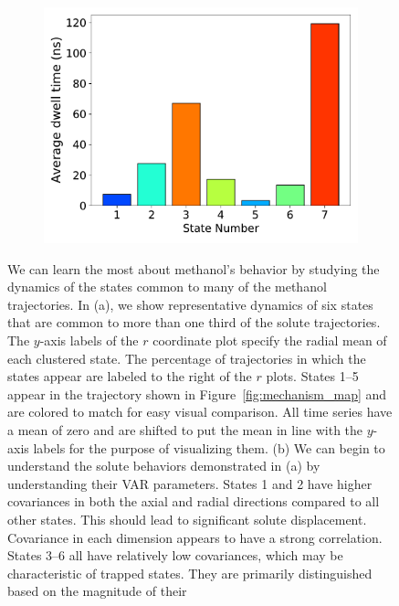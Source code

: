 \documentclass[journal=jpcbfk,manuscript=article]{achemso}
\begin{document}
\begin{figure}
\begin{subfigure}{0.35\textwidth}
  \caption{}\label{fig:A_sigma_scatter_MET}
  \includegraphics[width=\textwidth]{dwell_times_MET.pdf}  %
  \caption{}\label{fig:dwell_times_MET}
  \end{subfigure}
  \caption{We can learn the most about methanol's behavior by studying the dynamics
  of the states common to many of the methanol trajectories. In (a), we show representative
  dynamics of six states that are common to more than one third of the solute trajectories. 
  The $y$-axis labels of the $r$ coordinate plot specify the radial mean of each clustered 
  state. 
  The percentage of trajectories in which the states appear are labeled to the right of
  the $r$ plots. States 1--5 appear in the trajectory shown in Figure~\ref{fig:mechanism_map}
  and are colored to match for easy visual comparison. All time series have a mean of zero and are
  shifted to put the mean in line with the $y$-axis labels for the purpose of visualizing them. 
  (b) We can begin to understand the solute behaviors demonstrated in (a) by understanding their VAR 
  parameters. States 1 and 2 have higher covariances in both the axial and radial directions compared
  to all other states. This should lead to significant solute displacement. Covariance in each dimension
  appears to have a strong correlation. States 3--6 all have relatively low covariances, which may
  be characteristic of trapped states. They are primarily distinguished based on the magnitude of their 
}
\end{figure}
\end{document}
